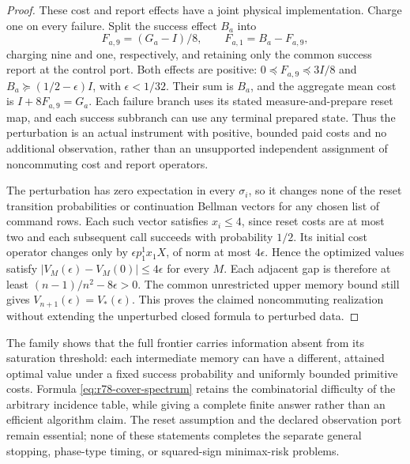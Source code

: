 \begin{proof}
These cost and report effects have a joint physical implementation.
Charge one on every failure.  Split the success effect $B_a$ into
\[
 F_{a,9}=(G_a-I)/8,\qquad F_{a,1}=B_a-F_{a,9},
\]
charging nine and one, respectively, and retaining only the common
success report at the control port.  Both effects are positive:
$0\preccurlyeq F_{a,9}\preccurlyeq3I/8$ and
$B_a\succeq(1/2-\epsilon)I$, with $\epsilon<1/32$.
Their sum is $B_a$, and the aggregate mean cost is
$I+8F_{a,9}=G_a$.  Each failure branch uses its stated
measure-and-prepare reset map, and each success subbranch can use
any terminal prepared state.  Thus the perturbation is an actual
instrument with positive, bounded paid costs and no additional
observation, rather than an unsupported independent assignment
of noncommuting cost and report operators.

The perturbation has zero expectation in every $\sigma_i$, so it
changes none of the reset transition probabilities or continuation
Bellman vectors for any chosen list of command rows.  Each such
vector satisfies $x_i\le4$, since reset costs are at most two and
each subsequent call succeeds with probability $1/2$.  Its initial
cost operator changes only by $\epsilon p^1_1x_1X$, of norm at
most $4\epsilon$.  Hence the optimized values satisfy
$|V_M(\epsilon)-V_M(0)|\le4\epsilon$ for every $M$.
Each adjacent gap is therefore at least
$(n-1)/n^2-8\epsilon>0$.  The common unrestricted upper memory
bound still gives $V_{n+1}(\epsilon)=V_*(\epsilon)$.  This proves
the claimed noncommuting realization without extending the
unperturbed closed formula to perturbed data.
\end{proof}

The family shows that the full frontier carries information absent
from its saturation threshold: each intermediate memory can have a
different, attained optimal value under a fixed success probability
and uniformly bounded primitive costs.  Formula
\eqref{eq:r78-cover-spectrum} retains the combinatorial difficulty
of the arbitrary incidence table, while giving a complete finite
answer rather than an efficient algorithm claim.  The reset
assumption and the declared observation port remain essential;
none of these statements completes the separate general stopping,
phase-type timing, or squared-sign minimax-risk problems.
